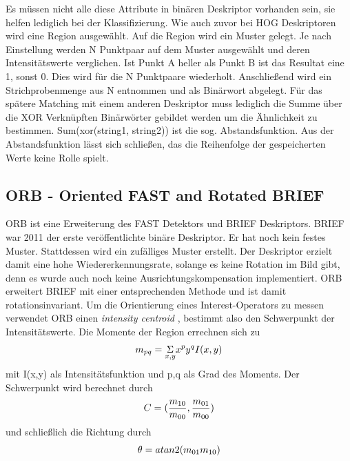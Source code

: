 Es müssen nicht alle diese Attribute in binären Deskriptor vorhanden sein, sie helfen lediglich bei der Klassifizierung. Wie auch zuvor bei HOG Deskriptoren wird eine Region ausgewählt. Auf die Region wird ein Muster gelegt. Je nach Einstellung werden N Punktpaar auf dem Muster ausgewählt und deren Intensitätswerte verglichen. Ist Punkt A heller als Punkt B ist das Resultat eine 1, sonst 0. Dies wird für die N Punktpaare wiederholt. Anschlie{\ss}end wird ein Strichprobenmenge aus N entnommen und als Binärwort abgelegt. Für das spätere Matching mit einem anderen Deskriptor muss lediglich die Summe über die XOR Verknüpften Binärwörter gebildet werden um die Ähnlichkeit zu bestimmen. Sum(xor(string1, string2)) ist die sog. Abstandsfunktion. Aus der Abstandsfunktion lässt sich schlie{\ss}en, das die Reihenfolge der gespeicherten Werte keine Rolle spielt.


\subsection{ORB - Oriented FAST and Rotated BRIEF}
ORB ist eine Erweiterung des FAST Detektors und BRIEF Deskriptors. BRIEF war 2011 der erste veröffentlichte binäre Deskriptor. Er hat noch kein festes Muster. Stattdessen wird ein zufälliges Muster erstellt. Der Deskriptor erzielt damit eine hohe Wiedererkennungsrate, solange es keine Rotation im Bild gibt, denn es wurde auch noch keine Ausrichtungskompensation implementiert. ORB erweitert BRIEF mit einer entsprechenden Methode und ist damit rotationsinvariant.
Um die Orientierung eines Interest-Operators zu messen verwendet ORB einen \textit{intensity centroid} \cite{Rosin1999MeasuringCP}, bestimmt also den Schwerpunkt der Intensitätswerte. Die Momente der Region errechnen sich zu
\begin{equation}
  \centering
  m_{pq}=\underset{x,y}{\Sigma}x^py^qI(x,y)
\end{equation}
mit I(x,y) als Intensitätsfunktion und p,q als Grad des Moments. Der Schwerpunkt wird berechnet durch
\begin{equation}
  \centering
  C = ( \frac{m_{10}}{m_{00}}, \frac{m_{01}}{m_{00}})
\end{equation}
und schlie{\ss}lich die Richtung durch 
\begin{equation}
  \centering
  \theta = atan2(m_{01}m_{10})
\end{equation}
